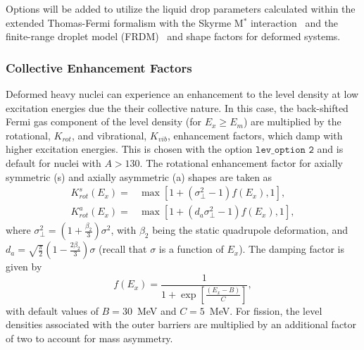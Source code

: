 \documentclass[
10pt,
showpacs,preprintnumbers,footinbib,
amsfonts,amsmath,amssymb,
aps,
prc,twocolumn,groupedaddress,superscriptaddress,
showkeys,
nofootinbib
]{revtex4-1}
\begin{document}
Options will be added to utilize the liquid drop parameters calculated within the extended Thomas-Fermi formalism with the Skyrme M$^*$ interaction~\cite{Guet:1988} and the finite-range droplet model (FRDM)~\cite{Moller:1997} and shape factors for deformed systems.

\subsubsection{Collective Enhancement Factors}

Deformed heavy nuclei can experience an enhancement to the level density at low excitation energies due the their collective nature. In this case, the back-shifted Fermi gas component of the level density (for $E_x \ge E_m$) are multiplied by the rotational, $K_{rot}$, and vibrational, $K_{vib}$, enhancement factors, which damp with higher excitation energies. This is chosen with the option ${\texttt {lev\_option 2}}$ and is default for nuclei with $A > 130$. The rotational enhancement factor for axially symmetric (s) and axially asymmetric (a) shapes are taken as~\cite{TALYS,Junghans:1998,Capote:2009}
\begin{align}
K_{rot}^s(E_x) =& \max [1 + (\sigma^2_\perp-1)f(E_x),1], \\
K_{rot}^a(E_x) =& \max [1 + (d_a\sigma^2_\perp-1)f(E_x),1], 
\end{align}
where $\sigma^2_\perp = (1+ \frac{\beta_2}{3})\sigma^2$, with $\beta_2$ being the static quadrupole deformation, and $d_a = \sqrt{\frac{\pi}{2}}(1-\frac{2\beta_2}{3})\sigma$ (recall that $\sigma$ is a function of $E_x$). The damping factor is given by
\begin{equation}
f(E_x) = \frac{1}{1+\exp\left [\frac{(E_x-B)}{C}\right ]},
\end{equation}
with default values of $B=30$~MeV and $C=5$~MeV.  For fission, the level densities associated with the outer barriers are multiplied by an additional factor of two to account for mass asymmetry. 
\end{document}
